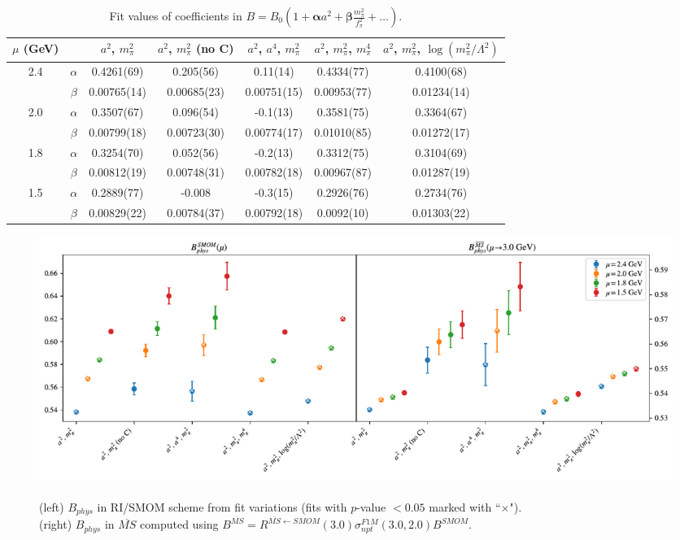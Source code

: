 \documentclass[12pt]{extarticle}
\begin{document}
\begin{table}[h!]
\begin{center}
\begin{tabular}{|c c|c|c|c|c|c|}
\hline
$\mu$ (GeV) &  & $a^2$, $m_\pi^2$& $a^2$, $m_\pi^2$ (no C)& $a^2$, $a^4$, $m_\pi^2$& $a^2$, $m_\pi^2$, $m_\pi^4$& $a^2$, $m_\pi^2$, $\log(m_\pi^2/\Lambda^2)$\\
\hline
\multirow{2}{0.5in}{2.4} & $\alpha$ & 0.4261(69)& 0.205(56)& 0.11(14)& 0.4334(77)& 0.4100(68)\\
 & $\beta$ & 0.00765(14)& 0.00685(23)& 0.00751(15)& 0.00953(77)& 0.01234(14)\\
\hline
\multirow{2}{0.5in}{2.0} & $\alpha$ & 0.3507(67)& 0.096(54)& -0.1(13)& 0.3581(75)& 0.3364(67)\\
 & $\beta$ & 0.00799(18)& 0.00723(30)& 0.00774(17)& 0.01010(85)& 0.01272(17)\\
\hline
\multirow{2}{0.5in}{1.8} & $\alpha$ & 0.3254(70)& 0.052(56)& -0.2(13)& 0.3312(75)& 0.3104(69)\\
 & $\beta$ & 0.00812(19)& 0.00748(31)& 0.00782(18)& 0.00967(87)& 0.01287(19)\\
\hline
\multirow{2}{0.5in}{1.5} & $\alpha$ & 0.2889(77)& -0.008& -0.3(15)& 0.2926(76)& 0.2734(76)\\
 & $\beta$ & 0.00829(22)& 0.00784(37)& 0.00792(18)& 0.0092(10)& 0.01303(22)\\
\hline
\end{tabular}
\caption{Fit values of coefficients in $B = B_0(1 + \mathbf{\alpha} a^2 + \mathbf{\beta} \frac{m_\pi^2}{f_\pi^2} + \ldots)$.}
\end{center}
\end{table}
\begin{figure}
\centering
\includegraphics[page=1, width=1.1\textwidth]{plots/SSpPP_fit_summary.pdf}
\caption{\\(left) $B_{phys}$ in RI/SMOM scheme from fit variations (fits with $p$-value $<0.05$ marked with ``$\times$"). \\(right) $B_{phys}$ in $\overline{MS}$ computed using $B^{\overline{MS}} = R^{\overline{MS}\leftarrow SMOM}(3.0)\sigma_{npt}^{F1M}(3.0, 2.0) B^{SMOM}$.}
\end{figure}
\end{document}
